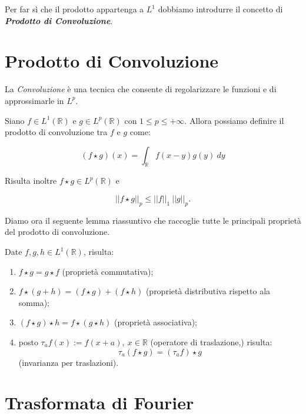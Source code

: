 Per far sì che il prodotto appartenga a $L^1$ dobbiamo introdurre il concetto di
\textit{\textbf{Prodotto di Convoluzione}}.

\section{Prodotto di Convoluzione}

La \textit{Convoluzione} è una tecnica che consente di regolarizzare le funzioni
e di approssimarle in $L^p$.
\begin{definition}
    Siano $f \in L^1(\mathbb{R})$ e $g \in L^p(\mathbb{R})$ con $1 \leq p \leq
        +\infty$. Allora possiamo definire il prodotto di convoluzione tra $f$ e $g$
    come:

    $$
        \left( f \star g\right)(x) = \int_{\mathbb{R}} f(x - y) g(y) \ dy
    $$

    Risulta inoltre $f \star g \in L^p(\mathbb{R})$ e

    $$
        ||f \star g||_p \leq ||f||_1 \ ||g||_p.
    $$
\end{definition}

Diamo ora il seguente lemma riassuntivo che raccoglie tutte le principali
proprietà del prodotto di convoluzione.

\begin{lemma}
    Date $f, g, h \in L^1(\mathbb{R})$, risulta:

    \begin{enumerate}
        \item $f \star g = g \star f$ (proprietà commutativa);
        \item $f \star (g + h) = (f \star g) + (f \star h)$ (proprietà
              distributiva rispetto ala somma);
        \item $(f \star g) \star h = f \star (g \star h)$ (proprietà
              associativa);
        \item posto $\tau_a f(x) := f(x + a), \ x \in \mathbb{R}$ (operatore di
              traslazione,) risulta:
              $$
                  \tau_a (f \star g) = (\tau_a f) \star g
              $$
              (invarianza per traslazioni).
    \end{enumerate}
\end{lemma}

\section{Trasformata di Fourier}

